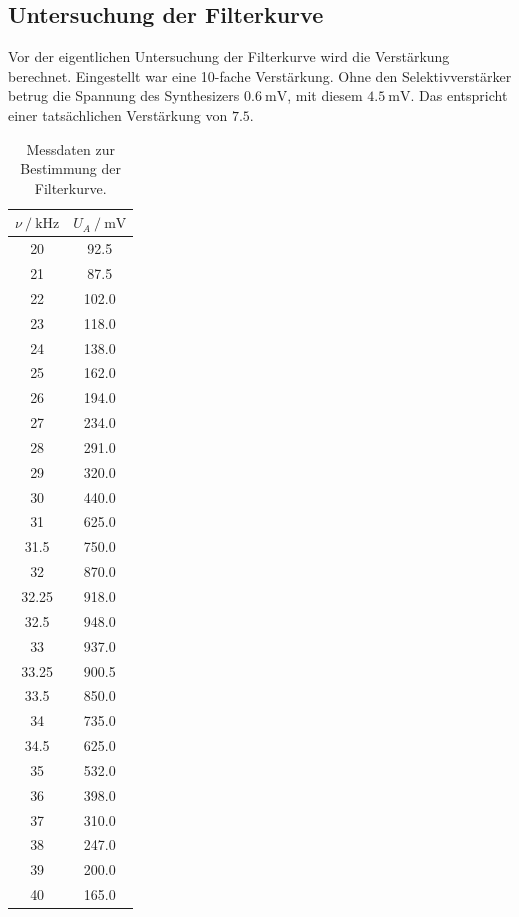 \subsection{Untersuchung der Filterkurve}

Vor der eigentlichen Untersuchung der Filterkurve wird die Verstärkung berechnet.
Eingestellt war eine 10-fache Verstärkung.
Ohne den Selektivverstärker betrug die Spannung des Synthesizers $\SI{0.6}{\milli\volt}$,
mit diesem $\SI{4.5}{\milli\volt}$.
Das entspricht einer tatsächlichen Verstärkung von $\num{7.5}$.

\begin{table}
  \centering
  \caption{Messdaten zur Bestimmung der Filterkurve.}
  \label{tab:filterkurve}
  \begin{tabular}{S[table-format=2.2] S[table-format=3.1]}
  \toprule
  $\nu \mathbin{/} \si{\kilo\hertz}$ &
  $U_A \mathbin{/} \si{\milli\volt}$ \\
  \midrule
  20    & 92.5  \\
  21    & 87.5  \\
  22    & 102.0 \\
  23    & 118.0 \\
  24    & 138.0 \\
  25    & 162.0 \\
  26    & 194.0 \\
  27    & 234.0 \\
  28    & 291.0 \\
  29    & 320.0 \\
  30    & 440.0 \\
  31    & 625.0 \\
  31.5  & 750.0 \\
  32    & 870.0 \\
  32.25 & 918.0 \\
  32.5  & 948.0 \\
  33    & 937.0 \\
  33.25 & 900.5 \\
  33.5  & 850.0 \\
  34    & 735.0 \\
  34.5  & 625.0 \\
  35    & 532.0 \\
  36    & 398.0 \\
  37    & 310.0 \\
  38    & 247.0 \\
  39    & 200.0 \\
  40    & 165.0 \\
  \bottomrule
  \end{tabular}
\end{table}

